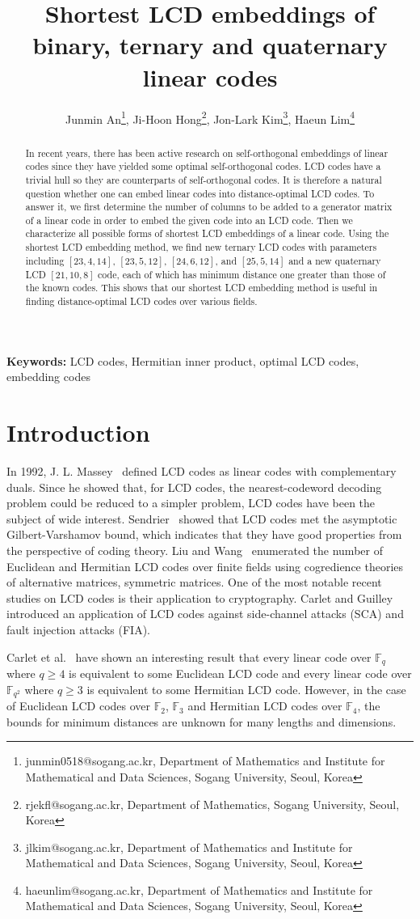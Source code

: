\documentclass{article}
\title{Shortest LCD embeddings of binary, ternary and quaternary linear codes}
\author{Junmin An\thanks{junmin0518@sogang.ac.kr, Department of Mathematics and Institute for Mathematical and Data Sciences, Sogang University, Seoul, Korea}, Ji-Hoon Hong\thanks{rjekfl@sogang.ac.kr, Department of Mathematics, Sogang University, Seoul, Korea}, Jon-Lark Kim\thanks{jlkim@sogang.ac.kr, Department of Mathematics and Institute for Mathematical and Data Sciences, Sogang University, Seoul, Korea}, Haeun Lim\thanks{haeunlim@sogang.ac.kr, Department of Mathematics and Institute for Mathematical and Data Sciences, Sogang University, Seoul, Korea}}
\date{}
\theoremstyle{definition}
\theoremstyle{remark}
\begin{document}
\maketitle

\begin{abstract}
In recent years, there has been active research on self-orthogonal embeddings of linear codes since they have yielded some optimal self-orthogonal codes. LCD codes have a trivial hull so they are counterparts of self-orthogonal codes. It is therefore a natural question whether one can embed linear codes into distance-optimal LCD codes. To answer it, we first determine the number of columns to be added to a generator matrix of a linear code in order to embed the given code into an LCD code. Then we characterize all possible forms of shortest LCD embeddings of a linear code. Using the shortest LCD embedding method, we find new ternary LCD codes with parameters including $[23, 4, 14]$, $[23, 5, 12]$, $[24, 6, 12]$, and $[25, 5, 14]$ and a new quaternary LCD $[21, 10, 8]$ code, each of which has minimum distance one greater than those of the known codes. This shows that our shortest LCD embedding method is useful in finding distance-optimal LCD codes over various fields.
\end{abstract}
\noindent\textbf{Keywords:} LCD codes, Hermitian inner product, optimal LCD codes, embedding codes

\section{Introduction}

In 1992, J. L. Massey~\cite{Massey-LCD-code} defined LCD codes as linear codes with complementary duals. Since he showed that, for LCD codes, the nearest-codeword decoding problem could be reduced to a simpler problem, LCD codes have been the subject of wide interest. Sendrier~\cite{Sendrier-LCD-GV} showed that LCD codes met the asymptotic Gilbert-Varshamov bound, which indicates that they have good properties from the perspective of coding theory. Liu and Wang~\cite{Liu-LCD-class} enumerated the number of Euclidean and Hermitian LCD codes over finite fields using cogredience theories of alternative matrices, symmetric matrices. One of the most notable recent studies on LCD codes is their application to cryptography. Carlet and Guilley~\cite{Carlet-LCD-side-channel} introduced an application of LCD codes against side-channel attacks (SCA) and fault injection attacks (FIA).

Carlet et al.~\cite{Carlet-LCD-equiv} have shown an interesting result that every linear code over $\mathbb{F}_q$ where $q\ge 4$ is equivalent to some Euclidean LCD code and every linear code over $\mathbb{F}_{q^2}$ where $q\ge 3$ is equivalent to some Hermitian LCD code. However, in the case of Euclidean LCD codes over $\mathbb{F}_2$, $\mathbb{F}_3$ and Hermitian LCD codes over $\mathbb{F}_4$, the bounds for minimum distances are unknown for many lengths and dimensions.
\end{document}
